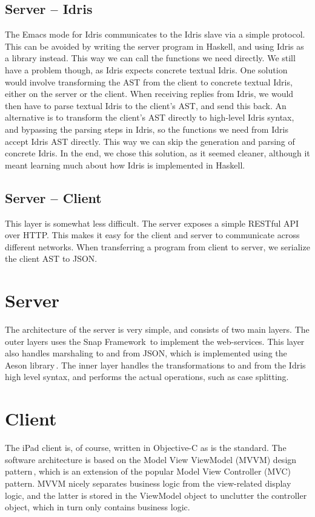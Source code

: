 \subsection{Server -- Idris}
The Emacs mode for Idris communicates to the Idris slave via a simple protocol. This can be avoided by writing the server program in
Haskell, and using Idris as a library instead. This way we can call the
functions we need directly. We still have a problem though, as Idris expects
concrete textual Idris. One solution would involve transforming the AST from 
the client to concrete textual Idris, either on the server or the client. When
receiving replies from Idris, we would then have to parse textual Idris to the
client's AST\@, and send this back. An alternative is to transform the 
client's AST directly to high-level Idris syntax, and bypassing the parsing
steps in Idris, so the functions we need from Idris accept Idris AST directly.
This way we can skip the generation and parsing of concrete Idris. In the end,
we chose this solution, as it seemed cleaner, although it meant learning much
about how Idris is implemented in Haskell.

\subsection{Server -- Client}
This layer is somewhat less difficult. The server exposes a simple RESTful API 
over HTTP\@. This makes it easy for the client and server to communicate across
different networks. When transferring a program from client to server, we
serialize the client AST to JSON\@.

\section{Server}
The architecture of the server is very simple, and consists of two main 
layers. The outer layers uses the Snap Framework\,\cite{snap_framework} to implement the 
web-services. This layer also handles marshaling to and from JSON\@, which is 
implemented using the Aeson library\,\cite{aeson_package}. The inner layer handles the 
transformations to and from the Idris high level syntax, and performs the 
actual operations, such as case splitting.

\section{Client}
The iPad client is, of course, written in Objective-C as is the standard. The
software architecture is based on the Model View ViewModel (MVVM) design 
pattern\,\cite{JohnGossman:MVVM}, which is an extension of the popular Model View Controller 
(MVC) pattern. MVVM nicely separates business logic from the view-related
display logic, and the latter is stored in the ViewModel object to unclutter 
the controller object, which in turn only contains business logic.

